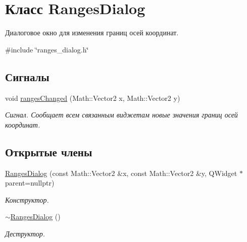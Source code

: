 \hypertarget{class_ranges_dialog}{}\section{Класс Ranges\+Dialog}
\label{class_ranges_dialog}


Диалоговое окно для изменения границ осей координат.  




{\ttfamily \#include \char`\"{}ranges\+\_\+dialog.\+h\char`\"{}}

\subsection*{Сигналы}
\begin{DoxyCompactItemize}
\item 
void \hyperlink{class_ranges_dialog_a8d4fb1f4d8bd2e5e3d0bc36f390e4974}{ranges\+Changed} (Math\+::\+Vector2 x, Math\+::\+Vector2 y)
\begin{DoxyCompactList}\small\item\em Сигнал. Сообщает всем связанным виджетам новые значения границ осей координат. \end{DoxyCompactList}\end{DoxyCompactItemize}
\subsection*{Открытые члены}
\begin{DoxyCompactItemize}
\item 
\hyperlink{class_ranges_dialog_a029bf2335408c07771d67c5875433214}{Ranges\+Dialog} (const Math\+::\+Vector2 \&x, const Math\+::\+Vector2 \&y, Q\+Widget $\ast$parent=nullptr)
\begin{DoxyCompactList}\small\item\em Конструктор. \end{DoxyCompactList}\item 
\hyperlink{class_ranges_dialog_a0852f0249101bfae86f5b7c037b77f97}{$\sim$\+Ranges\+Dialog} ()\hypertarget{class_ranges_dialog_a0852f0249101bfae86f5b7c037b77f97}{}\label{class_ranges_dialog_a0852f0249101bfae86f5b7c037b77f97}

\begin{DoxyCompactList}\small\item\em Деструктор. \end{DoxyCompactList}\end{DoxyCompactItemize}
